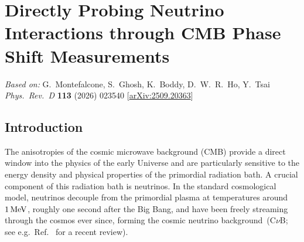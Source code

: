 \chapter{Directly Probing Neutrino Interactions through CMB Phase Shift Measurements}
\label{ch:neutrino-interactions}

\begin{center}
\textit{Based on:} G.~Montefalcone, S.~Ghosh, K.~Boddy, D.~W.~R.~Ho, Y.~Tsai\\
\textit{Phys.\ Rev.\ D} \textbf{113} (2026) 023540
[\href{https://arxiv.org/abs/2509.20363}{arXiv:2509.20363}]
\end{center}
\vspace{1em}

\providecommand{\Neff}{N_\mathrm{eff}}

\section{Introduction}
\label{sec:ch13-intro}

\noindent The anisotropies of the cosmic microwave background (CMB) provide a direct window into the physics of the early Universe and are particularly sensitive to the energy density and physical properties of the primordial radiation bath. A crucial component of this radiation bath is neutrinos. In the standard cosmological model, neutrinos decouple from the primordial plasma at temperatures around $1\,{\rm MeV}$, roughly one second after the Big Bang, and have been freely streaming through the cosmos ever since, forming the cosmic neutrino background~(C$\nu$B; see e.g.\ Ref.~\cite{Scott:2024rwc} for a recent review).

